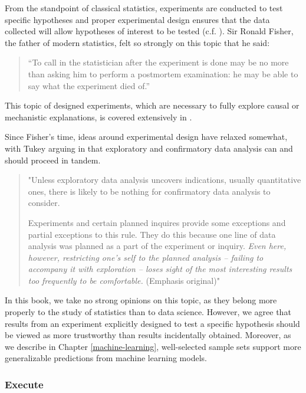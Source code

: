 \documentclass[
]{book}
\begin{document}
From the standpoint of classical statistics, experiments are conducted to test specific hypotheses and proper experimental design ensures that the data collected will allow hypotheses of interest to be tested (c.f. \citet{Fisher1935}). Sir Ronald Fisher, the father of modern statistics, felt so strongly on this topic that he said:

\begin{quote}
``To call in the statistician after the experiment is done may be no more than asking him to perform a postmortem examination: he may be able to say what the experiment died of.''
\end{quote}

This topic of designed experiments, which are necessary to fully explore causal or mechanistic explanations, is covered extensively in \citet{Lawson2014}.

Since Fisher's time, ideas around experimental design have relaxed somewhat, with Tukey arguing in \citet{Tukey1977} that exploratory and confirmatory data analysis can and should proceed in tandem.

\begin{quote}
"Unless exploratory data analysis uncovers indications, usually quantitative ones, there is likely to be nothing for confirmatory data analysis to consider.

Experiments and certain planned inquires provide some exceptions and partial exceptions to this rule. They do this because one line of data analysis was planned as a part of the experiment or inquiry. \emph{Even here, however, restricting one's self to the planned analysis -- failing to accompany it with exploration -- loses sight of the most interesting results too frequently to be comfortable.} (Emphasis original)"
\end{quote}

In this book, we take no strong opinions on this topic, as they belong more properly to the study of statistics than to data science. However, we agree that results from an experiment explicitly designed to test a specific hypothesis should be viewed as more trustworthy than results incidentally obtained. Moreover, as we describe in Chapter \ref{machine-learning}, well-selected sample sets support more generalizable predictions from machine learning models.

\hypertarget{execute}{%
\subsubsection{Execute}\label{execute}}
\end{document}
